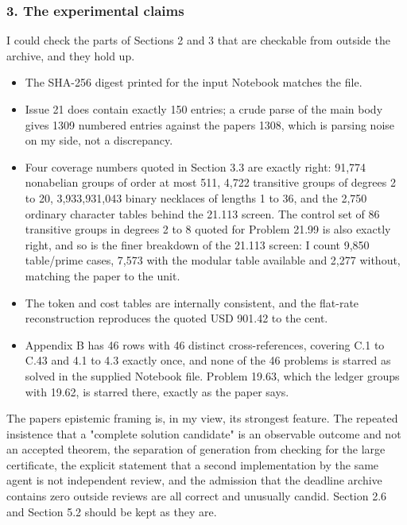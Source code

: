 \hypertarget{review-md-the-experimental-claims}{%
\subsubsection*{3. The experimental
claims}\label{review-md-the-experimental-claims}}

I could check the parts of Sections 2 and 3 that are checkable from
outside the archive, and they hold up.

\begin{itemize}
\tightlist
\item
  The SHA-256 digest printed for the input Notebook matches the file.
\item
  Issue 21 does contain exactly 150 entries; a crude parse of the main
  body gives 1309 numbered entries against the paper\textquotesingle s
  1308, which is parsing noise on my side, not a discrepancy.
\item
  Four coverage numbers quoted in Section 3.3 are exactly right: 91,774
  nonabelian groups of order at most 511, 4,722 transitive groups of
  degrees 2 to 20, 3,933,931,043 binary necklaces of lengths 1 to 36,
  and the 2,750 ordinary character tables behind the 21.113 screen. The
  control set of 86 transitive groups in degrees 2 to 8 quoted for
  Problem 21.99 is also exactly right, and so is the finer breakdown of
  the 21.113 screen: I count 9,850 table/prime cases, 7,573 with the
  modular table available and 2,277 without, matching the paper to the
  unit.
\item
  The token and cost tables are internally consistent, and the flat-rate
  reconstruction reproduces the quoted USD 901.42 to the cent.
\item
  Appendix B has 46 rows with 46 distinct cross-references, covering C.1
  to C.43 and 4.1 to 4.3 exactly once, and none of the 46 problems is
  starred as solved in the supplied Notebook file. Problem 19.63, which
  the ledger groups with 19.62, is starred there, exactly as the paper
  says.
\end{itemize}

The paper\textquotesingle s epistemic framing is, in my view, its
strongest feature. The repeated insistence that a "complete solution
candidate" is an observable outcome and not an accepted theorem, the
separation of generation from checking for the large certificate, the
explicit statement that a second implementation by the same agent is not
independent review, and the admission that the deadline archive contains
zero outside reviews are all correct and unusually candid. Section 2.6
and Section 5.2 should be kept as they are.

